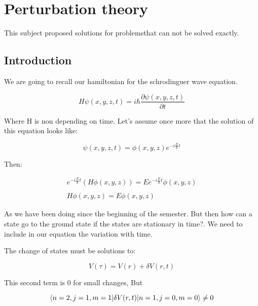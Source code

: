 \setchapterpreamble[u]{\margintoc}
\chapter{Perturbation theory}

This subject proposed solutions for problemsthat can not be solved exactly.

\section{Introduction}

We are going to recall our hamiltonian for the schrodinguer wave equation.

\begin{equation}
  H \psi(x,y,z,t) =i \hbar \frac{\partial \psi(x,y,z,t)}{\partial t}
\end{equation}

Where H is non depending on time. Let's assume once more that the solution of this equation looks like:

\begin{equation}
  \psi(x,y,z,t) = \phi(x,y,z) e^{-i\frac{E}{\hbar}t}
\end{equation}

Then:

\begin{equation}
  \begin{array}{c}
  e^{-i\frac{E}{\hbar}t}(H \phi(x,y,z)) = E e^{-i\frac{E}{\hbar}t} \phi(x,y,z)
  \\

  \\
  H \phi(x,y,z) = E \phi(x,y,z)
  \end{array}
\end{equation}

As we have been doing since the beginning of the semester. But then how can a state go to the ground state if the states are stationary in time?. We need to include in our equation the variation with time.

The change of states must be solutions to:

\begin{equation}
  V(\tau) = V(r) + \delta V(r,t)
\end{equation}

This second term is 0 for small changes, But

\begin{equation}
  \langle n=2,j=1,m=1\rvert\delta V(r,t)\lvert n=1,j=0,m=0\rangle \neq 0
\end{equation}

